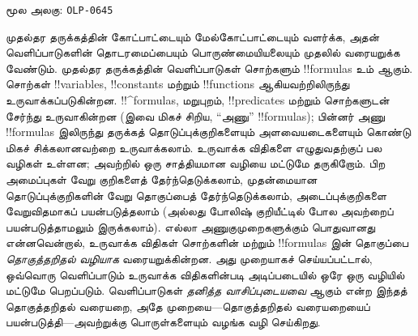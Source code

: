 \documentclass[11pt,a4paper,openany]{memoir}
\begin{document}

\clearpage
\noindent மூல அலகு: \texttt{OLP-0645}\par






முதல்தர தருக்கத்தின் கோட்பாட்டையும் மேல்கோட்பாட்டையும் வளர்க்க, அதன்
வெளிப்பாடுகளின் தொடரமைப்பையும் பொருண்மையியலையும் முதலில் வரையறுக்க வேண்டும்.
முதல்தர தருக்கத்தின் வெளிப்பாடுகள் சொற்களும் !!{formula}s உம் ஆகும். சொற்கள்
!!{variable}s, !!{constant}s மற்றும் !!{function}s ஆகியவற்றிலிருந்து
உருவாக்கப்படுகின்றன. !!^{formula}s, மறுபுறம், !!{predicate}s மற்றும் சொற்களுடன்
சேர்ந்து உருவாகின்றன (இவை மிகச் சிறிய, ``அணு'' !!{formula}s); பின்னர் அணு
!!{formula}s இலிருந்து தருக்கத் தொடுப்புக்குறிகளையும் அளவையடைகளையும் கொண்டு
மிகச் சிக்கலானவற்றை உருவாக்கலாம். உருவாக்க விதிகளை எழுதுவதற்குப் பல வழிகள்
உள்ளன; அவற்றில் ஒரு சாத்தியமான வழியை மட்டுமே தருகிறோம். பிற அமைப்புகள்
வேறு குறிகளைத் தேர்ந்தெடுக்கலாம், முதன்மையான தொடுப்புக்குறிகளின் வேறு
தொகுப்பைத் தேர்ந்தெடுக்கலாம், அடைப்புக்குறிகளை வேறுவிதமாகப் பயன்படுத்தலாம்
(அல்லது போலிஷ் குறியீட்டில் போல அவற்றைப் பயன்படுத்தாமலும் இருக்கலாம்).
எல்லா அணுகுமுறைகளுக்கும் பொதுவானது என்னவென்றால், உருவாக்க விதிகள் சொற்களின்
மற்றும் !!{formula}s இன் தொகுப்பை \emph{தொகுத்தறிதல் வழியாக} வரையறுக்கின்றன.
அது முறையாகச் செய்யப்பட்டால், ஒவ்வொரு வெளிப்பாடும் உருவாக்க விதிகளின்படி
அடிப்படையில் ஒரே ஒரு வழியில் மட்டுமே பெறப்படும். வெளிப்பாடுகள்
\emph{தனித்த வாசிப்புடையவை} ஆகும் என்ற இந்தத் தொகுத்தறிதல் வரையறை,
அதே முறையை---தொகுத்தறிதல் வரையறையைப் பயன்படுத்தி---அவற்றுக்கு
பொருள்களையும் வழங்க வழி செய்கிறது.
\end{document}
